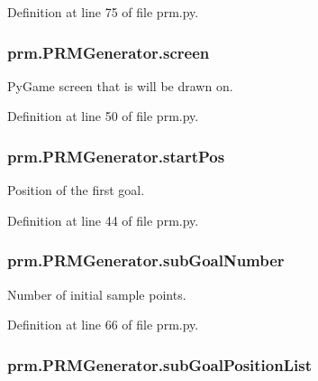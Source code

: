 Definition at line 75 of file prm.\-py.

\hypertarget{classprm_1_1PRMGenerator_ab7fc7e3fa902029c3c3432ec0444be93}{
\subsubsection[{screen}]{\setlength{\rightskip}{0pt plus 5cm}prm.\-P\-R\-M\-Generator.\-screen}}\label{classprm_1_1PRMGenerator_ab7fc7e3fa902029c3c3432ec0444be93}


Py\-Game screen that is will be drawn on. 



Definition at line 50 of file prm.\-py.

\hypertarget{classprm_1_1PRMGenerator_a784ce423bc47ebc7a09632948eb903eb}{
\subsubsection[{start\-Pos}]{\setlength{\rightskip}{0pt plus 5cm}prm.\-P\-R\-M\-Generator.\-start\-Pos}}\label{classprm_1_1PRMGenerator_a784ce423bc47ebc7a09632948eb903eb}


Position of the first goal. 



Definition at line 44 of file prm.\-py.

\hypertarget{classprm_1_1PRMGenerator_af8d162e83184c5493019e868e53fcefd}{
\subsubsection[{sub\-Goal\-Number}]{\setlength{\rightskip}{0pt plus 5cm}prm.\-P\-R\-M\-Generator.\-sub\-Goal\-Number}}\label{classprm_1_1PRMGenerator_af8d162e83184c5493019e868e53fcefd}


Number of initial sample points. 



Definition at line 66 of file prm.\-py.

\hypertarget{classprm_1_1PRMGenerator_a6c5a8c95cfb4636e37404d2f2dce78f8}{
\subsubsection[{sub\-Goal\-Position\-List}]{\setlength{\rightskip}{0pt plus 5cm}prm.\-P\-R\-M\-Generator.\-sub\-Goal\-Position\-List}}\label{classprm_1_1PRMGenerator_a6c5a8c95cfb4636e37404d2f2dce78f8}


